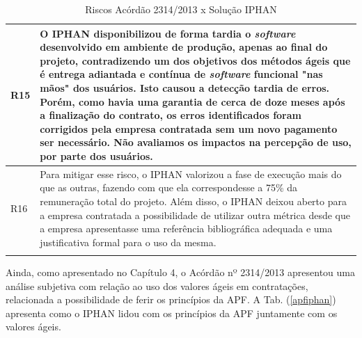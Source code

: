 \begin{longtable}{|p{2cm}|p{13cm}|}
R15                                                               & O IPHAN disponibilizou de forma tardia o \textit{software} desenvolvido em ambiente de produção, apenas ao final do projeto, contradizendo um dos objetivos dos métodos ágeis que é entrega adiantada e contínua de \textit{software} funcional "nas mãos" dos usuários. Isto causou a detecção tardia de erros. Porém, como havia uma garantia de cerca de doze meses após a finalização do contrato, os erros identificados foram corrigidos pela empresa contratada sem um novo pagamento ser necessário. Não avaliamos os impactos na percepção de uso, por parte dos usuários.            \\ \hline
R16                                                               &  Para mitigar esse risco, o IPHAN valorizou a fase de execução mais do que as outras, fazendo com que ela correspondesse a 75\% da remuneração total do projeto. Além disso, o IPHAN deixou aberto para a empresa contratada a possibilidade de utilizar outra métrica desde que a empresa apresentasse uma referência bibliográfica adequada e uma justificativa formal para o uso da mesma.              \\ \hline

\caption{Riscos Acórdão 2314/2013 x Solução IPHAN}
		\label{riscosiphan}
\end{longtable}

Ainda, como apresentado no Capítulo 4, o Acórdão nº 2314/2013 apresentou uma análise subjetiva com relação ao uso dos valores ágeis em contratações, relacionada a possibilidade de ferir os princípios da APF. A Tab. (\ref{apfiphan}) apresenta como o IPHAN lidou com os princípios da APF juntamente com os valores ágeis.

